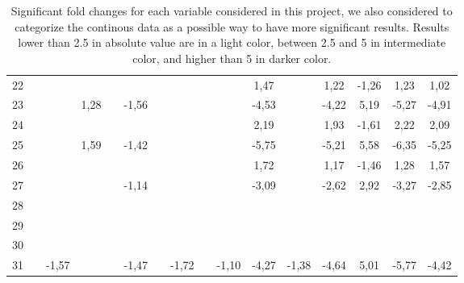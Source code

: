 \documentclass[a4paper, 11pt]{article}
\begin{document}
\begin{multicols}{2}
\begin{table}[t]
{\begin{tabular}{|c|c c|c|c c|c c|c c|c|c c|c|cc|}
22 &  &  &  &  &  &  &  &  &  & \cellcolor[HTML]{FDFF89}1,47 &  & \cellcolor[HTML]{FDFF89}1,22 & \cellcolor[HTML]{B4F5F2}-1,26 & \cellcolor[HTML]{FDFF89}1,23 & \cellcolor[HTML]{FDFF89}1,02 \\
23 &  &  & \cellcolor[HTML]{FDFF89}1,28 &  & \cellcolor[HTML]{B4F5F2}-1,56 &  &  &  &  & \cellcolor[HTML]{4AD7FF}-4,53 &  & \cellcolor[HTML]{4AD7FF}-4,22 & \cellcolor[HTML]{F56B00}5,19 & \cellcolor[HTML]{6F94FF}-5,27 & \cellcolor[HTML]{4AD7FF}-4,91 \\
24 &  &  &  &  &  &  &  &  &  & \cellcolor[HTML]{FDFF89}2,19 &  & \cellcolor[HTML]{FDFF89}1,93 & \cellcolor[HTML]{B4F5F2}-1,61 & \cellcolor[HTML]{FDFF89}2,22 & \cellcolor[HTML]{FDFF89}2,09 \\
25 &  &  & \cellcolor[HTML]{FDFF89}1,59 &  & \cellcolor[HTML]{B4F5F2}-1,42 &  &  &  &  & \cellcolor[HTML]{6F94FF}-5,75 &  & \cellcolor[HTML]{6F94FF}-5,21 & \cellcolor[HTML]{F56B00}5,58 & \cellcolor[HTML]{6F94FF}-6,35 & \cellcolor[HTML]{6F94FF}-5,25 \\
26 &  &  &  &  &  &  &  &  &  & \cellcolor[HTML]{FDFF89}1,72 &  & \cellcolor[HTML]{FDFF89}1,17 & \cellcolor[HTML]{B4F5F2}-1,46 & \cellcolor[HTML]{FDFF89}1,28 & \cellcolor[HTML]{FDFF89}1,57 \\
27 &  &  &  &  & \cellcolor[HTML]{B4F5F2}-1,14 &  &  &  &  & \cellcolor[HTML]{4AD7FF}-3,09 &  & \cellcolor[HTML]{4AD7FF}-2,62 & \cellcolor[HTML]{FFC702}2,92 & \cellcolor[HTML]{4AD7FF}-3,27 & \cellcolor[HTML]{4AD7FF}-2,85 \\
28 &  &  &  &  &  &  &  &  &  &  &  &  &  &  &  \\
29 &  &  &  &  &  &  &  &  &  &  &  &  &  &  &  \\
30 &  &  &  &  &  &  &  &  &  &  &  &  &  &  &  \\
31 &  & \cellcolor[HTML]{B4F5F2}-1,57 &  &  & \cellcolor[HTML]{B4F5F2}-1,47 &  & \cellcolor[HTML]{B4F5F2}-1,72 &  & \cellcolor[HTML]{B4F5F2}-1,10 & \cellcolor[HTML]{4AD7FF}-4,27 & \cellcolor[HTML]{B4F5F2}-1,38 & \cellcolor[HTML]{4AD7FF}-4,64 & \cellcolor[HTML]{F56B00}5,01 & \cellcolor[HTML]{6F94FF}-5,77 & \cellcolor[HTML]{4AD7FF}-4,42 \\
\hline
\end{tabular}}
\caption{Significant fold changes for each variable considered in this project, we also considered to categorize the continous data as a possible way to have more significant results. Results lower than 2.5 in absolute value are in a light color, between 2.5 and 5 in intermediate color, and higher than 5 in darker color.}
\label{tab:Q2FC}
\end{table}


\end{multicols}
\end{document}
